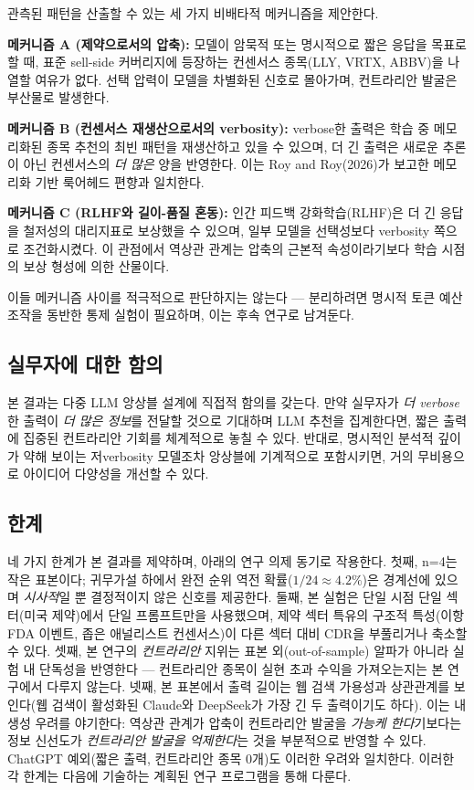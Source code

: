 \documentclass[11pt,letterpaper]{article}
\begin{document}
관측된 패턴을 산출할 수 있는 세 가지 비배타적 메커니즘을 제안한다.

\textbf{메커니즘 A (제약으로서의 압축):} 모델이 암묵적 또는 명시적으로 짧은 응답을 목표로 할 때, 표준 sell-side 커버리지에 등장하는 컨센서스 종목(LLY, VRTX, ABBV)을 나열할 여유가 없다. 선택 압력이 모델을 차별화된 신호로 몰아가며, 컨트라리안 발굴은 부산물로 발생한다.

\textbf{메커니즘 B (컨센서스 재생산으로서의 verbosity):} verbose한 출력은 학습 중 메모리화된 종목 추천의 최빈 패턴을 재생산하고 있을 수 있으며, 더 긴 출력은 새로운 추론이 아닌 컨센서스의 \textit{더 많은} 양을 반영한다. 이는 Roy and Roy(2026)가 보고한 메모리화 기반 룩어헤드 편향과 일치한다.

\textbf{메커니즘 C (RLHF와 길이-품질 혼동):} 인간 피드백 강화학습(RLHF)은 더 긴 응답을 철저성의 대리지표로 보상했을 수 있으며, 일부 모델을 선택성보다 verbosity 쪽으로 조건화시켰다. 이 관점에서 역상관 관계는 압축의 근본적 속성이라기보다 학습 시점의 보상 형성에 의한 산물이다.

이들 메커니즘 사이를 적극적으로 판단하지는 않는다 --- 분리하려면 명시적 토큰 예산 조작을 동반한 통제 실험이 필요하며, 이는 후속 연구로 남겨둔다.

\subsection{실무자에 대한 함의}

본 결과는 다중 LLM 앙상블 설계에 직접적 함의를 갖는다. 만약 실무자가 \textit{더 verbose}한 출력이 \textit{더 많은 정보}를 전달할 것으로 기대하며 LLM 추천을 집계한다면, 짧은 출력에 집중된 컨트라리안 기회를 체계적으로 놓칠 수 있다. 반대로, 명시적인 분석적 깊이가 약해 보이는 저verbosity 모델조차 앙상블에 기계적으로 포함시키면, 거의 무비용으로 아이디어 다양성을 개선할 수 있다.

\subsection{한계}

네 가지 한계가 본 결과를 제약하며, 아래의 연구 의제 동기로 작용한다. 첫째, n=4는 작은 표본이다; 귀무가설 하에서 완전 순위 역전 확률($1/24\approx 4.2\%$)은 경계선에 있으며 \textit{시사적}일 뿐 결정적이지 않은 신호를 제공한다. 둘째, 본 실험은 단일 시점 단일 섹터(미국 제약)에서 단일 프롬프트만을 사용했으며, 제약 섹터 특유의 구조적 특성(이항 FDA 이벤트, 좁은 애널리스트 컨센서스)이 다른 섹터 대비 CDR을 부풀리거나 축소할 수 있다. 셋째, 본 연구의 \textit{컨트라리안} 지위는 표본 외(out-of-sample) 알파가 아니라 실험 내 단독성을 반영한다 --- 컨트라리안 종목이 실현 초과 수익을 가져오는지는 본 연구에서 다루지 않는다. 넷째, 본 표본에서 출력 길이는 웹 검색 가용성과 상관관계를 보인다(웹 검색이 활성화된 Claude와 DeepSeek가 가장 긴 두 출력이기도 하다). 이는 내생성 우려를 야기한다: 역상관 관계가 압축이 컨트라리안 발굴을 \textit{가능케 한다}기보다는 정보 신선도가 \textit{컨트라리안 발굴을 억제한다}는 것을 부분적으로 반영할 수 있다. ChatGPT 예외(짧은 출력, 컨트라리안 종목 0개)도 이러한 우려와 일치한다. 이러한 각 한계는 다음에 기술하는 계획된 연구 프로그램을 통해 다룬다.
\end{document}
